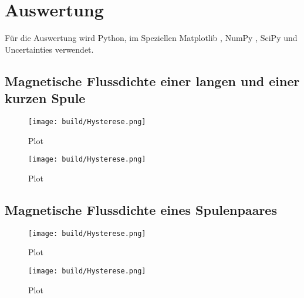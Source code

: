 \section{Auswertung}
\label{sec:Auswertung}

Für die Auswertung wird Python, im Speziellen Matplotlib \cite{matplotlib}, NumPy \cite{numpy},
SciPy \cite{scipy} und Uncertainties \cite{uncertainties} verwendet.

\subsection{Magnetische Flussdichte einer langen und einer kurzen Spule}

\begin{figure}
    \centering
    \texttt{[image: build/Hysterese.png]} %
    \caption{Plot}
\end{figure}




\begin{figure}
    \centering
    \texttt{[image: build/Hysterese.png]} %
    \caption{Plot}
\end{figure}


\subsection{Magnetische Flussdichte eines Spulenpaares}

\begin{figure}
    \centering
    \texttt{[image: build/Hysterese.png]} %
    \caption{Plot}
\end{figure}




\begin{figure}
    \centering
    \texttt{[image: build/Hysterese.png]} %
    \caption{Plot}
\end{figure}

